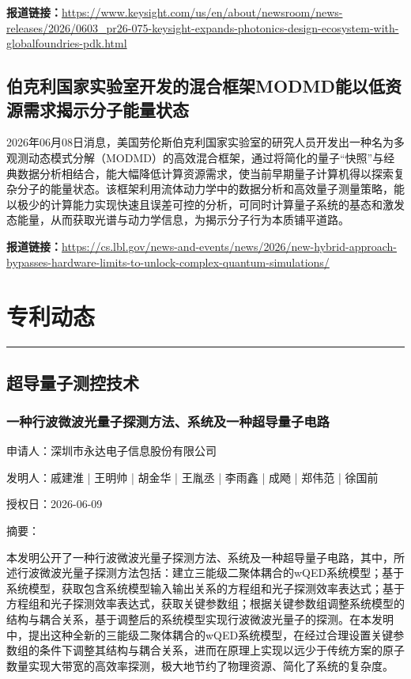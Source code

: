 \documentclass[12pt,a4paper]{ctexart}
\begin{document}
\noindent\textbf{报道链接：}\url{https://www.keysight.com/us/en/about/newsroom/news-releases/2026/0603\_pr26-075-keysight-expands-photonics-design-ecosystem-with-globalfoundries-pdk.html}

\subsection{ 伯克利国家实验室开发的混合框架MODMD能以低资源需求揭示分子能量状态 }

2026年06月08日消息，美国劳伦斯伯克利国家实验室的研究人员开发出一种名为多观测动态模式分解（MODMD）的高效混合框架，通过将简化的量子“快照”与经典数据分析相结合，能大幅降低计算资源需求，使当前早期量子计算机得以探索复杂分子的能量状态。该框架利用流体动力学中的数据分析和高效量子测量策略，能以极少的计算能力实现快速且误差可控的分析，可同时计算量子系统的基态和激发态能量，从而获取光谱与动力学信息，为揭示分子行为本质铺平道路。

\noindent\textbf{报道链接：}\url{https://cs.lbl.gov/news-and-events/news/2026/new-hybrid-approach-bypasses-hardware-limits-to-unlock-complex-quantum-simulations/}



\newpage
\section{专利动态}
\vspace{-0.5em}
\noindent\rule{\linewidth}{1.5pt}

\subsection{ 超导量子测控技术 }

\subsubsection{ 一种行波微波光量子探测方法、系统及一种超导量子电路 }

申请人：深圳市永达电子信息股份有限公司

发明人：戚建淮 | 王明帅 | 胡金华 | 王胤丞 | 李雨鑫 | 成飏 | 郑伟范 | 徐国前

授权日：2026-06-09

摘要：

本发明公开了一种行波微波光量子探测方法、系统及一种超导量子电路，其中，所述行波微波光量子探测方法包括：建立三能级二聚体耦合的wQED系统模型；基于系统模型，获取包含系统模型输入输出关系的方程组和光子探测效率表达式；基于方程组和光子探测效率表达式，获取关键参数组；根据关键参数组调整系统模型的结构与耦合关系，基于调整后的系统模型实现行波微波光量子的探测。在本发明中，提出这种全新的三能级二聚体耦合的wQED系统模型，在经过合理设置关键参数组的条件下调整其结构与耦合关系，进而在原理上实现以远少于传统方案的原子数量实现大带宽的高效率探测，极大地节约了物理资源、简化了系统的复杂度。
\end{document}

